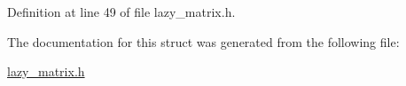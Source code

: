 Definition at line 49 of file lazy\+\_\+matrix.\+h.



The documentation for this struct was generated from the following file\+:\begin{DoxyCompactItemize}
\item 
\mbox{\hyperlink{lazy__matrix_8h}{lazy\+\_\+matrix.\+h}}\end{DoxyCompactItemize}

